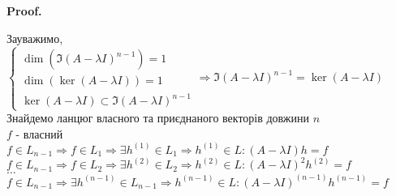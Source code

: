\documentclass[a4paper, 10pt]{article}
\makeatletter
\theoremstyle{theoremdd}
\renewenvironment{proof}[1][Proof.\\]{\par
\pushQED{\hfill \qed}%
\normalfont \topsep6\p@\@plus6\p@\relax
\trivlist
\item\relax
{\bfseries
#1\@addpunct{.}}\hspace\labelsep\ignorespaces
}{%
\popQED\endtrivlist\@endpefalse
}
\makeatother
\begin{document}
\begin{proof}
Зауважимо,\\
$\begin{cases}
\dim (\Im(A-\lambda I)^{n-1}) = 1\\
\dim (\ker (A-\lambda I)) = 1\\
\ker (A-\lambda I) \subset \Im(A-\lambda I)^{n-1}
\end{cases} \Rightarrow \Im(A-\lambda I)^{n-1} = \ker(A-\lambda I)
$\\
Знайдемо ланцюг власного та приєднаного векторів довжини $n$\\
$f$ - власний\\
$f \in L_{n-1} \Rightarrow f \in L_1 \Rightarrow \exists h^{(1)} \in L_1 \Rightarrow h^{(1)} \in L: (A-\lambda I)h = f$\\
$f \in L_{n-1} \Rightarrow f \in L_2 \Rightarrow \exists h^{(2)} \in L_2 \Rightarrow h^{(2)} \in L: (A-\lambda I)^2 h^{(2)} = f$\\
$\dots$\\
$f \in L_{n-1} \Rightarrow \exists h^{(n-1)} \in L_{n-1} \Rightarrow h^{(n-1)} \in L: (A-\lambda I)^{(n-1)}h^{(n-1)} = f$
\end{proof}
\end{document}
